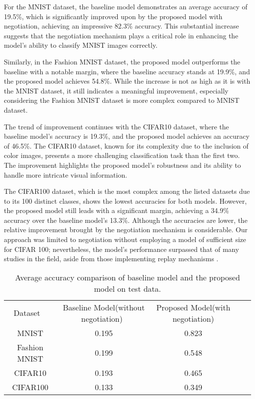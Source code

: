 \documentclass{article}
\begin{document}
For the MNIST dataset, the baseline model demonstrates an average accuracy of 19.5\%, which is significantly improved upon by the proposed model with negotiation, achieving an impressive 82.3\% accuracy. This substantial increase suggests that the negotiation mechanism plays a critical role in enhancing the model's ability to classify MNIST images correctly.

Similarly, in the Fashion MNIST dataset, the proposed model outperforms the baseline with a notable margin, where the baseline accuracy stands at 19.9\%, and the proposed model achieves 54.8\%. While the increase is not as high as it is with the MNIST dataset, it still indicates a meaningful improvement, especially considering the Fashion MNIST dataset is more complex compared to MNIST dataset.

The trend of improvement continues with the CIFAR10 dataset, where the baseline model's accuracy is 19.3\%, and the proposed model achieves an accuracy of 46.5\%. The CIFAR10 dataset, known for its complexity due to the inclusion of color images, presents a more challenging classification task than the first two. The improvement highlights the proposed model's robustness and its ability to handle more intricate visual information.

The CIFAR100 dataset, which is the most complex among the listed datasets due to its 100 distinct classes, shows the lowest accuracies for both models. However, the proposed model still leads with a significant margin, achieving a 34.9\% accuracy over the baseline model's 13.3\%. Although the accuracies are lower, the relative improvement brought by the negotiation mechanism is considerable. Our approach was limited to negotiation without employing a model of sufficient size for CIFAR 100; nevertheless, the model's performance surpassed that of many studies in the field, aside from those implementing replay mechanisms \cite{sokar2021self,zhou2023deep}.


\begin{table}[H]
\caption{Average accuracy comparison of baseline model and the proposed model on test data.}
\centering
\begin{tabular}{ccccc}
Dataset \ & Baseline Model(without negotiation)\ & Proposed Model(with negotiation) &  \\ \cline{1-4}
MNIST          & 0.195      & 0.823                                  &  \\ 
Fashion MNIST  & 0.199      & 0.548                                  &  \\ 
CIFAR10        & 0.193      & 0.465                                  &  \\ 
CIFAR100       & 0.133      & 0.349                                  &  \\  \cline{1-4}
\end{tabular}
\label{table:Table_acc}
\end{table}
\end{document}
